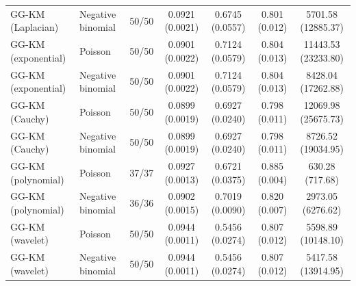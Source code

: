 \begin{table}[tbp]
\begin{tabular}{llccccc}
GG-KM (Laplacian)
& Negative binomial
& 50/50
& 0.0921 (0.0021)
& 0.6745 (0.0557)
& 0.801 (0.012)
& 5701.58 (12885.37) \\

GG-KM (exponential)
& Poisson
& 50/50
& 0.0901 (0.0022)
& 0.7124 (0.0579)
& 0.804 (0.013)
& 11443.53 (23233.80) \\

GG-KM (exponential)
& Negative binomial
& 50/50
& 0.0901 (0.0022)
& 0.7124 (0.0579)
& 0.804 (0.013)
& 8428.04 (17262.88) \\

GG-KM (Cauchy)
& Poisson
& 50/50
& 0.0899 (0.0019)
& 0.6927 (0.0240)
& 0.798 (0.011)
& 12069.98 (25675.73) \\

GG-KM (Cauchy)
& Negative binomial
& 50/50
& 0.0899 (0.0019)
& 0.6927 (0.0240)
& 0.798 (0.011)
& 8726.52 (19034.95) \\



GG-KM (polynomial)
& Poisson
& 37/37
& 0.0927 (0.0013)
& 0.6721 (0.0375)
& 0.885 (0.004)
& 630.28 (717.68) \\

GG-KM (polynomial)
& Negative binomial
& 36/36
& 0.0902 (0.0015)
& 0.7019 (0.0090)
& 0.820 (0.007)
& 2973.05 (6276.62) \\

GG-KM (wavelet)
& Poisson
& 50/50
& 0.0944 (0.0011)
& 0.5456 (0.0274)
& 0.807 (0.012)
& 5598.89 (10148.10) \\

GG-KM (wavelet)
& Negative binomial
& 50/50
& 0.0944 (0.0011)
& 0.5456 (0.0274)
& 0.807 (0.012)
& 5417.58 (13914.95) \\

\hline
\end{tabular}
\end{table}
